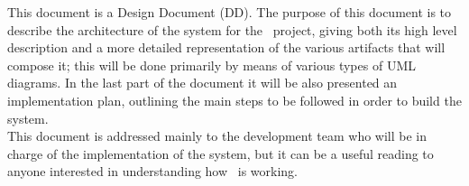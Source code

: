 This document is a Design Document (DD). The purpose of this document is to describe the architecture of the system for the \projectname~project, giving both its high level description and a more detailed representation of the various artifacts that will compose it; this will be done primarily by means of various types of UML diagrams. In the last part of the document it will be also presented an implementation plan, outlining the main steps to be followed in order to build the system. \\
This document is addressed mainly to the development team who will be in charge of the implementation of the system, but it can be a useful reading to anyone interested in understanding how \projectname~is working.